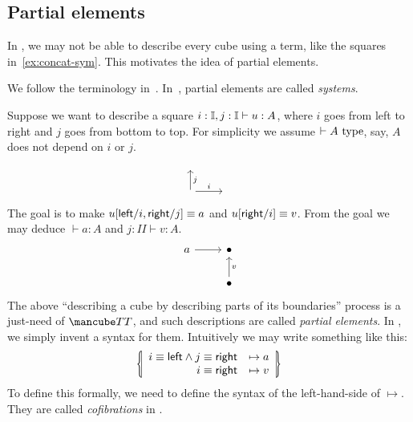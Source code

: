 \subsection{Partial elements}\label{sub:partial}
In \CTT, we may not be able to describe every cube using a term,
like the squares in~\cref{ex:concat-sym}.
This motivates the idea of partial elements.
\begin{terminology}
We follow the terminology in~\cite{CubicalAgda}.
In~\cite{CCHM}, partial elements are called \textit{systems}.
\end{terminology}
Suppose we want to describe a square $i:\mathbb{I},j:\mathbb{I}\vdash u:A$,
where $i$ goes from left to right and $j$ goes from bottom to top.
For simplicity we assume $\vdash A~\text{type}$, say, $A$ does not depend on $i$ or $j$.
\[\begin{tikzcd}
	{} \\
	{} & {}
	\arrow["i", from=2-1, to=2-2]
	\arrow["j"', from=2-1, to=1-1]
\end{tikzcd}\]
The goal is to make $u[\textsf{left}/i, \textsf{right}/j]\equiv a$ and $u[\textsf{right}/i]\equiv v$.
From the goal we may deduce $\vdash a:A$ and $j:II\vdash v:A$.
\[\begin{tikzcd}
	a & \bullet \\
	& \bullet
	\arrow[from=1-1, to=1-2]
	\arrow["v"', from=2-2, to=1-2]
\end{tikzcd}\]
The above ``describing a cube by describing parts of its boundaries''
process is a just-need of $\CTT$, and such descriptions are called \textit{partial elements}.
In \CTT, we simply invent a syntax for them.
Intuitively we may write something like this:
\[\lrbbar{\begin{array}{rc}
  i\equiv\lcon \land j\equiv\rcon&\mapsto a\\
  i\equiv\rcon &\mapsto v
\end{array}}\]
To define this formally, we need to define the syntax of the left-hand-side of $\mapsto$.
They are called \textit{cofibrations} in \CTT.
